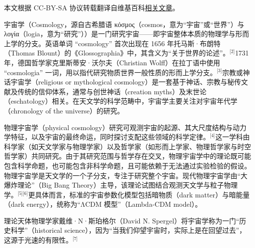 
本文根据 CC-BY-SA 协议转载翻译自维基百科\href{https://en.wikipedia.org/wiki/Cosmology}{相关文章}。

宇宙学（Cosmology，源自古希腊语 κόσμος（cosmos，意为“宇宙”或“世界”）与 λογία（logia，意为“研究”））是一门研究宇宙——即宇宙整体本质的物理学与形而上学的分支。英语单词 “cosmology” 首次出现在 1656 年托马斯·布朗特（Thomas Blount）的《Glossographia》中，其含义为“关于世界的论述”。\(^\text{[2]}\)1731 年，德国哲学家克里斯蒂安·沃尔夫（Christian Wolff）在拉丁语中使用 “cosmologia” 一词，用以指代研究物质世界一般性质的形而上学分支。\(^\text{[3]}\)宗教或神话宇宙学（religious or mythological cosmology）是一套基于神话、宗教与秘传文献及传统的信仰体系，通常与创世神话（creation myths）及末世论（eschatology）相关。在天文学的科学范畴中，宇宙学主要关注对宇宙年代学（chronology of the universe）的研究。

物理宇宙学（physical cosmology）研究可观测宇宙的起源、其大尺度结构与动力学特征，以及宇宙的最终命运，同时探讨支配这些领域的科学定律。\(^\text{[4]}\)这一学科由科学家（如天文学家与物理学家）以及哲学家（如形而上学家、物理哲学家与时空哲学家）共同研究。由于其研究范围与哲学存在交叉，物理宇宙学中的理论既可能包含科学命题，也可能包含非科学命题，且可能依赖于无法通过实验检验的假设。物理宇宙学是天文学的一个子分支，专注于研究整个宇宙。现代物理宇宙学由“大爆炸理论”（Big Bang Theory）主导，该理论试图结合观测天文学与粒子物理学。\(^\text{[5][6]}\)更具体而言，标准的宇宙参数化模型包括暗物质（dark matter）与暗能量（dark energy），统称为“ΛCDM 模型”（Lambda-CDM model）。

理论天体物理学家戴维·N·斯珀格尔（David N. Spergel）将宇宙学称为一门“历史科学”（historical science），因为“当我们仰望宇宙时，实际上是在回望过去”，这源于光速的有限性。\(^\text{[7]}\)

